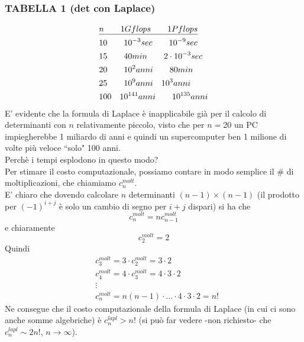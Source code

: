 \subsubsection{TABELLA 1 (det con Laplace)}
\[ \begin{split}
	& \uline{n\quad\quad 1Gflops\quad\quad 1Pflops}\\
	&  10\quad\quad 10^{-3}sec\quad\quad 10^{-9}sec\\
	&  15\quad\quad 40min\quad\quad 2\cdot10^{-3}sec\\
	& 20\quad\quad 10^{2}anni\quad\quad 80min\\
	& 25\quad\quad 10^{9}anni\quad 10^{3}anni\\
	& 100\quad 10^{141}anni\quad\quad 10^{135}anni\\ 
\end{split} \]
E' evidente che la formula di Laplace è inapplicabile già per il calcolo di determinanti con $n$ relativamente piccolo, visto che per $n=20$ un PC impiegherebbe 1 miliardo di anni e quindi un supercomputer ben 1 milione di volte più veloce ``solo" 100 anni.\\Perchè i tempi esplodono in questo modo?\\Per stimare il costo computazionale, possiamo contare in modo semplice il \# di moltiplicazioni, che chiamiamo $c_n^{molt}$.\\
E' chiaro che dovendo calcolare $n$ determinanti $(n-1)\times (n-1)$ (il prodotto per $(-1)^{i+j}$ è solo un cambio di segno per $i+j$ dispari) si ha che 
\begin{equation*}
    c_n^{molt} = n c_{n-1}^{molt}
\end{equation*}
e chiaramente
\begin{equation*}
    c_2^{molt} = 2
\end{equation*}
Quindi
\begin{equation*}
    \begin{split}
        & c_3^{molt} = 3 \cdot c_2^{molt} = 3\cdot 2 \\
        & c_4^{molt} = 4 \cdot c_3^{molt} = 4\cdot 3\cdot 2 \\
        & \vdots \\
        & c_n^{molt} = n(n-1)\cdot ... \cdot 4\cdot 3\cdot 2 = n!
    \end{split}
\end{equation*}
Ne consegue che il costo computazionale della formula di Laplace (in cui ci sono anche somme algebriche) è $c_n^{lapl} > n!$ (si può far vedere -non richiesto- che $c_n^{lapl} \sim 2n!$, $n \to \infty$). \\
